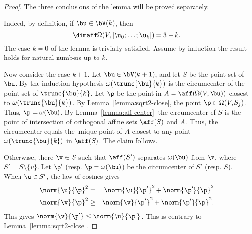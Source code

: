 \begin{proof} The three conclusions of the lemma will be proved
separately.

 Indeed, by
definition, if $\bu\in \bV(k)$, then
\begin{displaymath} 
\dimaff\Omega(V,[\u_0;\ldots;\u_k]) = 3-k.
\end{displaymath}  
The case $k=0$ of the lemma is trivially satisfied.  Assume by
induction the result holds for natural numbers up to $k$.

Now consider the case $k+1$.  Let $\bu\in \bV(k+1)$, and let $S$ be
the point set of $\bu$.  By the induction hypothesis
$\omega(\trunc{\bu}{k})$ is the circumcenter of the point set of
$\trunc{\bu}{k}$.  Let $\p$ be the point in
$A=\aff(\Omega(V,\bu))$ closest to $\omega(\trunc{\bu}{k})$.  By
Lemma~\ref{lemma:sqrt2-close}, the point $\p\in\Omega(V,S_{j})$.
Thus, $\p=\omega(\bu)$.  By Lemma~\ref{lemma:aff-center}, the
circumcenter of $S$ is the point of intersection of orthogonal affine
sets $\aff(S)$ and $A$.  Thus, the circumcenter equals the unique
point of $A$ closest to any point $\omega(\trunc{\bu}{k})$ in
$\aff(S)$.  The claim follows.



Otherwise, there $\v\in S$ such that $\aff(S')$ separates $\omega(\bu)$ from
$ \v$, where $S'=S\setminus\{v\}$.  Let $\p'$ (resp. $\p=\omega(\bu)$)
be the circumcenter
of $S'$ (resp. $S$).  When $\u\in S'$, the law of cosines gives
\begin{eqnarray*} 
\norm{ \u}{\p}^2 &=& \norm{\u}{\p'}^2 + \norm{\p'}{\p}^2\\ 
\norm{ \v}{\p}^2 &\ge& \norm{\v}{\p'}^2 + \norm{\p'}{\p}^2.
\end{eqnarray*}
This gives $\norm{\v}{\p'}\le \norm{\u}{\p'}$.  This is contrary to
Lemma~\ref{lemma:sqrt2-close}.


\end{proof}
